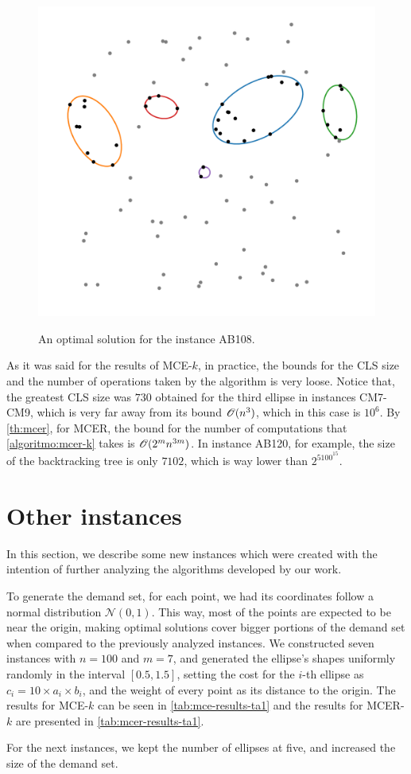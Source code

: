 \begin{figure}[!htb]
	\centering
	\caption{An optimal solution for the instance AB108.}
	\includegraphics[scale=.5]{tex/figures/AB108}
	\fautor
	\label{fig:AB108}
\end{figure}

As it was said for the results of MCE-$k$, in practice, the bounds for the CLS size and the number of operations taken by the algorithm is very loose.
Notice that, the greatest CLS size was $730$ obtained for the third ellipse in instances CM7-CM9, which is very far away from its bound $\mathscr{O}(n^3)$, which in this case is $10^6$. By \autoref{th:mcer}, for MCER, the bound for the number of computations that \autoref{algoritmo:mcer-k} takes is $\mathscr{O}(2^mn^{3m})$. In instance AB120, for example, the size of the backtracking tree is only $7102$, which is way lower than $2^5100^{15}$.

\section{Other instances}

In this section, we describe some new instances which were created with the intention of further analyzing the algorithms developed by our work.

To generate the demand set, for each point, we had its coordinates follow a normal distribution $\mathcal{N}(0, 1)$. This way, most of the points are expected to be near the origin, making optimal solutions cover bigger portions of the demand set when compared to the previously analyzed instances.
We constructed seven instances with $n=100$ and $m=7$, and generated the ellipse's shapes uniformly randomly in the interval $[0.5, 1.5]$, setting the cost for the $i$-th ellipse as $c_i=10 \times a_i\times b_i$, and the weight of every point as its distance to the origin. The results for MCE-$k$ can be seen in \autoref{tab:mce-results-ta1} and the results for MCER-$k$ are presented in \autoref{tab:mcer-results-ta1}.





For the next instances, we kept the number of ellipses at five, and increased the size of the demand set.
